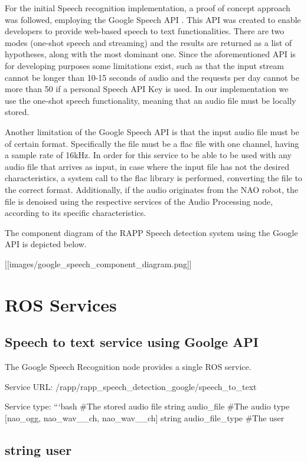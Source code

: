For the initial Speech recognition implementation, a proof of concept approach was followed, employing the Google Speech A\-P\-I . This A\-P\-I was created to enable developers to provide web-\/based speech to text functionalities. There are two modes (one-\/shot speech and streaming) and the results are returned as a list of hypotheses, along with the most dominant one. Since the aforementioned A\-P\-I is for developing purposes some limitations exist, such as that the input stream cannot be longer than 10-\/15 seconds of audio and the requests per day cannot be more than 50 if a personal Speech A\-P\-I Key is used. In our implementation we use the one-\/shot speech functionality, meaning that an audio file must be locally stored.

Another limitation of the Google Speech A\-P\-I is that the input audio file must be of certain format. Specifically the file must be a flac file with one channel, having a sample rate of 16k\-Hz. In order for this service to be able to be used with any audio file that arrives as input, in case where the input file has not the desired characteristics, a system call to the flac library is performed, converting the file to the correct format. Additionally, if the audio originates from the N\-A\-O robot, the file is denoised using the respective services of the Audio Processing node, according to its specific characteristics.

The component diagram of the R\-A\-P\-P Speech detection system using the Google A\-P\-I is depicted below.

\mbox{[}\mbox{[}images/google\-\_\-speech\-\_\-component\-\_\-diagram.\-png\mbox{]}\mbox{]}

\section*{R\-O\-S Services}

\subsection*{Speech to text service using Goolge A\-P\-I}

The Google Speech Recognition node provides a single R\-O\-S service.

Service U\-R\-L\-: {\ttfamily /rapp/rapp\-\_\-speech\-\_\-detection\-\_\-google/speech\-\_\-to\-\_\-text}

Service type\-: ```bash \#\-The stored audio file string audio\-\_\-file \#\-The audio type \mbox{[}nao\-\_\-ogg, nao\-\_\-wav\-\_\-\_\-ch, nao\-\_\-wav\-\_\-\_\-ch\mbox{]} string audio\-\_\-file\-\_\-type \#\-The user \subsection*{string user }

